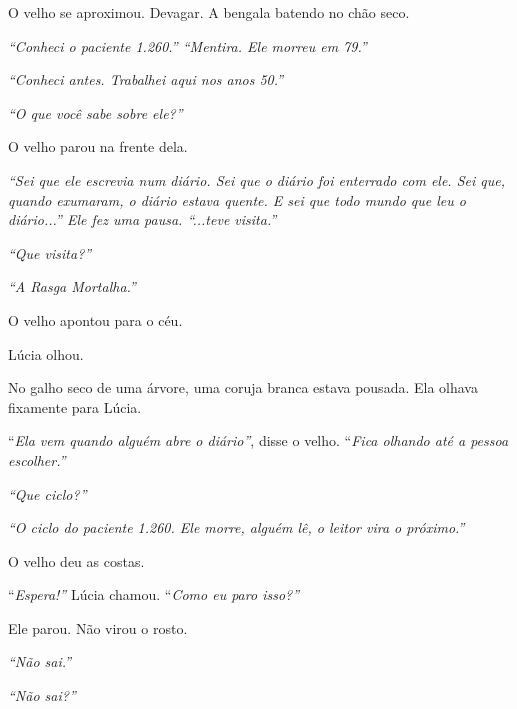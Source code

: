 \noindent O velho se aproximou. Devagar. A bengala batendo no chão seco.

\noindent \textit{\textquotedblleft{}Conheci o paciente 1.260.\textquotedblright{}\textit{ }\textquotedblleft{}Mentira. Ele morreu em 79.\textquotedblright{}}

\noindent \textit{\textquotedblleft{}Conheci antes. Trabalhei aqui nos anos 50.\textquotedblright{}}

\noindent \textit{\textquotedblleft{}O que você sabe sobre ele?\textquotedblright{}}

\noindent O velho parou na frente dela.

\noindent \textit{\textquotedblleft{}Sei que ele escrevia num diário. Sei que o diário foi enterrado com ele. Sei que, quando exumaram, o diário estava quente. E sei que todo mundo que leu o diário...\textquotedblright{}\textit{ Ele fez uma pausa. }\textquotedblleft{}...teve visita.\textquotedblright{}}

\noindent \textit{\textquotedblleft{}Que visita?\textquotedblright{}}

\noindent \textit{\textquotedblleft{}A Rasga Mortalha.\textquotedblright{}}

\noindent O velho apontou para o céu.

\noindent Lúcia olhou.

\noindent No galho seco de uma árvore, uma coruja branca estava pousada. Ela olhava fixamente para Lúcia.

\noindent \textquotedblleft{\textit{Ela vem quando alguém abre o diário\textquotedblright{}}, disse o velho. }\textquotedblleft{\textit{Fica olhando até a pessoa escolher.\textquotedblright{}}}

\noindent \textit{\textquotedblleft{}Que ciclo?\textquotedblright{}}

\noindent \textit{\textquotedblleft{}O ciclo do paciente 1.260. Ele morre, alguém lê, o leitor vira o próximo.\textquotedblright{}}

\noindent O velho deu as costas.

\noindent \textquotedblleft{\textit{Espera!\textquotedblright{}} Lúcia chamou. }\textquotedblleft{\textit{Como eu paro isso?\textquotedblright{}}}

\noindent Ele parou. Não virou o rosto.

\noindent \textit{\textquotedblleft{}Não sai.\textquotedblright{}}

\noindent \textit{\textquotedblleft{}Não sai?\textquotedblright{}}

